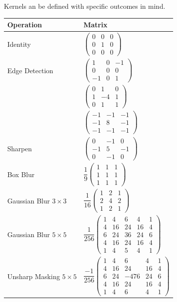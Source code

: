\documentclass[11pt,a4paper]{article}
\begin{document}
Kernels an be defined with specific outcomes in mind.\\
\begin{longtable}{|l|l|}
\hline
\textbf{Operation}&\textbf{Matrix}\\
\hline
Identity&$\begin{pmatrix}
0&0&0\\
0&1&0\\
0&0&0
\end{pmatrix}$\\
\hline
Edge Detection&$\begin{pmatrix}
1&0&-1\\
0&0&0\\
-1&0&1
\end{pmatrix}$\\
&$\begin{pmatrix}
0&1&0\\
1&-4&1\\
0&1&1
\end{pmatrix}$\\
&$\begin{pmatrix}
-1&-1&-1\\
-1&8&-1\\
-1&-1&-1
\end{pmatrix}$\\
\hline
Sharpen&$\begin{pmatrix}
0&-1&0\\
-1&5&-1\\
0&-1&0
\end{pmatrix}$\\
\hline
Box Blur&$\dfrac{1}{9}\begin{pmatrix}
1&1&1\\
1&1&1\\
1&1&1
\end{pmatrix}$
\\
\hline
Gaussian Blur $3\times3$&$\dfrac{1}{16}\begin{pmatrix}
1&2&1\\
2&4&2\\
1&2&1
\end{pmatrix}$\\
\hline
Gaussian Blur $5\times5$&$\dfrac{1}{256}\begin{pmatrix}
1&4&6&4&1\\
4&16&24&16&4\\
6&24&36&24&6\\
4&16&24&16&4\\
1&4&5&4&1
\end{pmatrix}$\\
\hline
Unsharp Masking $5\times5$&$\dfrac{-1}{256}\begin{pmatrix}
1&4&6&4&1\\
4&16&24&16&4\\
6&24&-476&24&6\\
4&16&24&16&4\\
1&4&6&4&1
\end{pmatrix}$\\
\hline
\end{longtable}
\end{document}
